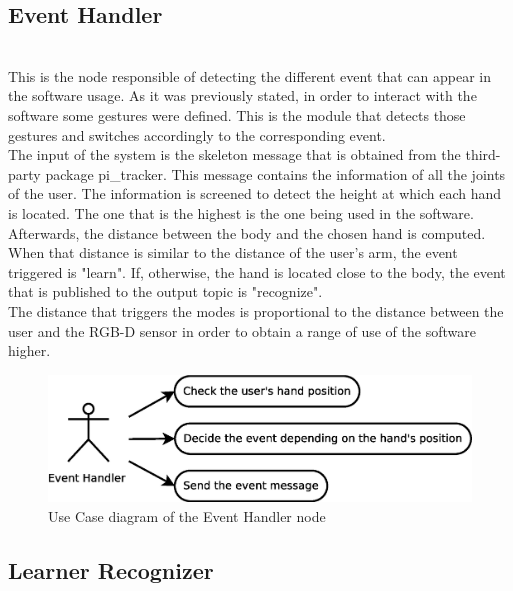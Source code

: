 \subsection{Event Handler}\\

	This is the node responsible of detecting the different event that can appear in the software usage. As it was previously stated, in order to interact with the software some gestures were defined. This is the module that detects those gestures and switches accordingly to the corresponding event. 
	\\

	The input of the system is the skeleton message that is obtained from the third-party package pi\_tracker. This message contains the information of all the joints of the user. The information is screened to detect the height at which each hand is located. The one that is the highest is the one being used in the software. Afterwards, the distance between the body and the chosen hand is computed. When that distance is similar to the distance of the user's arm, the event triggered is "learn". If, otherwise, the hand is located close to the body, the event that is published to the output topic is "recognize". 
	\\

	The distance that triggers the modes is proportional to the distance between the user and the RGB-D sensor in order to obtain a range of use of the software higher. 
	\begin{figure}[H]
		\centering
			\includegraphics[scale=0.4]{img/diagrams/uc_event_handler.eps}
			\caption[Use case diagram Event Handler node]{Use Case diagram of the Event Handler node}
		
	\end{figure}

\subsection{Learner Recognizer}\\
\label{learner_recognizer}

